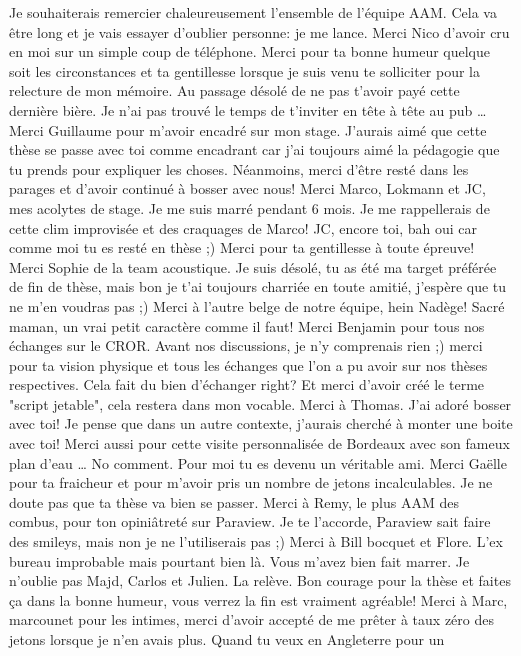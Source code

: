 Je souhaiterais remercier chaleureusement
l'ensemble de l'équipe AAM. Cela va être long et je vais
essayer d'oublier personne: je me lance. 
Merci Nico d'avoir cru en moi sur un simple coup
de téléphone. Merci pour ta bonne humeur quelque soit les
circonstances et ta gentillesse lorsque je suis venu te solliciter
pour la relecture de mon mémoire. Au passage désolé de ne pas
t'avoir payé cette dernière bière. Je n'ai pas trouvé le temps de t'inviter
en tête à tête au pub \ldots{} Merci Guillaume pour m'avoir encadré
sur mon stage. J'aurais aimé que cette thèse se passe avec toi comme
encadrant car j'ai toujours aimé la pédagogie que
tu prends pour expliquer les choses. 
Néanmoins, merci d'être resté dans les parages et d'avoir
continué à bosser avec nous!
Merci Marco, Lokmann
et JC, mes acolytes de stage. Je me suis marré pendant 6 mois.
Je me rappellerais de cette clim improvisée et des craquages de Marco!
JC, encore toi, bah oui car comme moi tu es resté en thèse ;)
Merci pour ta gentillesse à toute épreuve! Merci Sophie de
la team acoustique. Je suis désolé, tu as été ma target préférée
de fin de thèse, mais bon je t'ai toujours charriée en toute amitié,
j'espère que tu ne m'en voudras pas ;) 
Merci à l'autre belge de notre équipe, hein Nadège! 
Sacré maman, un vrai petit caractère comme il faut! Merci Benjamin
pour tous nos échanges sur le CROR. Avant nos discussions, je n'y
comprenais rien ;) merci pour ta vision physique et tous les échanges
que l'on a pu avoir sur nos thèses respectives. Cela fait du bien
d'échanger right? Et merci d'avoir créé le terme "script jetable",
cela restera dans mon vocable. Merci à Thomas. J'ai adoré bosser avec
toi! Je pense que dans un autre contexte, j'aurais cherché à
monter une boite avec toi! Merci aussi pour cette visite personnalisée
de Bordeaux avec son fameux plan d'eau \ldots{} No comment. Pour moi tu es
devenu un véritable ami. Merci Gaëlle
pour ta fraicheur et pour m'avoir pris un nombre de jetons incalculables.
Je ne doute pas que ta thèse va bien se passer.
Merci à Remy, le plus AAM des combus, pour ton opiniâtreté sur Paraview.
Je te l'accorde, Paraview sait faire des smileys, 
mais non je ne l'utiliserais pas ;)
Merci à Bill bocquet et Flore. L'ex bureau improbable mais pourtant
bien là. Vous m'avez bien fait marrer. Je n'oublie pas Majd, Carlos et Julien.
La relève. Bon courage pour la thèse et faites ça dans la bonne humeur, vous
verrez la fin est vraiment agréable!
Merci à Marc, marcounet pour les intimes, merci d'avoir accepté de me prêter à taux
zéro des
jetons lorsque je n'en avais plus. Quand tu veux en Angleterre pour un
